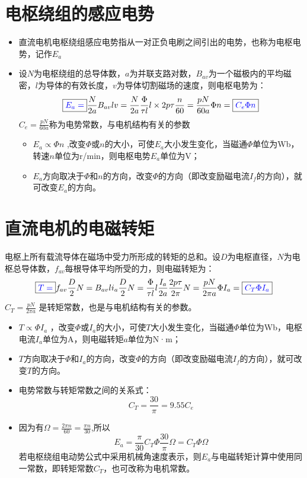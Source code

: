 \documentclass[blue]{elegantnote}
\begin{document}
\section{电枢绕组的感应电势}
\begin{itemize}
	\item 直流电机电枢绕组感应电势指从一对正负电刷之间引出的电势，也称为电枢电势，记作$E_{a}$
	\item 设$N$为电枢绕组的总导体数，$a$为并联支路对数，$B_{av}$为一个磁极内的平均磁密，$l$为导体的有效长度，$v$为导体切割磁场的速度，则电枢电势为：
	$$\boxed{\color{blue}{E_a} = }\frac{N}{2a}{B_{av}}lv = \frac{N}{2a}\frac{\Phi }{\tau l}l \times 2p\tau \frac{n}{60} = \frac{pN}{{60a}}\Phi n = \boxed{\color{blue}{C_e}\Phi n}$$
	$C_{e}=\frac{pN}{60a}$称为电势常数，与电机结构有关的参数
	\begin{itemize}
		\item $E_{a}\propto \Phi n$
		,改变$\Phi$或$n$的大小，可使$E_{a}$大小发生变化，当磁通$\Phi$单位为Wb，转速$n$单位为r/min，则电枢电势${E_{a}}$单位为V；
		\item
		$E_{a}$方向取决于$\Phi$和$n$的方向，改变$\Phi$的方向（即改变励磁电流$I_{f}$的方向），就可改变$E_{a}$的方向。
	\end{itemize}
\end{itemize}
\section{直流电机的电磁转矩}
电枢上所有载流导体在磁场中受力所形成的转矩的总和。设$D$为电枢直径，$N$为电枢总导体数，$f_{av}$每根导体平均所受的力，则电磁转矩为： 
$$\boxed{\color{blue}T =} {f_{av}}\frac{D}{2}N = {B_{av}}l{i_a}\frac{D}{2}N = \frac{\Phi }{{\tau l}}l\frac{{{I_a}}}{{2a}}\frac{{2p\tau }}{{2\pi }}N = \frac{{pN}}{{2\pi a}}\Phi {I_a}=\boxed{\color{blue}{C_T}\Phi {I_a}}$$
${C_T} = \frac{{pN}}{{2\pi a}}$ 是转矩常数，也是与电机结构有关的参数。 
\begin{itemize}
	\item
	 $T \propto \Phi I_{a}$ ，改变$\Phi$或$I_{a}$的大小，可使$T$大小发生变化，当磁通$\Phi$单位为Wb，电枢电流$I_{a}$单位为A，则电磁转矩$a$单位为N·m；
	\item $T$方向取决于$\Phi$和$I_a$的方向，改变$\Phi$的方向（即改变励磁电流$I_{f}$的方向），就可改变$T$的方向。
	\item 电势常数与转矩常数之间的关系式：
	$$C_{T}=\frac{30}{\pi}=9.55C_{e}$$
	\item 因为有$\Omega=\frac{2\pi n}{60}=\frac{\pi n }{30}$,所以
		\[{E_a} = \frac{\pi }{{30}}{C_T}\Phi \frac{{30}}{\pi }\Omega  = {C_T}\Phi \Omega \]
	若电枢绕组电动势公式中采用机械角速度表示，则$E_{a}$与电磁转矩计算中使用同一常数，即转矩常数$C_{T}$，也可改称为电机常数。 
\end{itemize}
\end{document}
